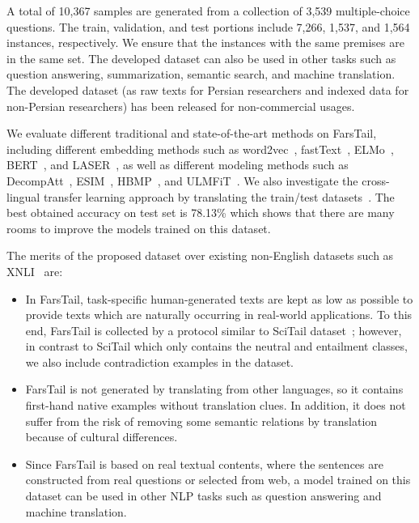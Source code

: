 \documentclass[preprint,12pt]{elsarticle}
\begin{document}
A total of 10,367 samples are generated from a collection of 3,539 multiple-choice questions. The train, validation, and test portions include 7,266, 1,537, and 1,564 instances, respectively. We ensure that the instances with the same premises are in the same set. The developed dataset can also be used in other tasks such as question answering, summarization, semantic search, and machine translation. The developed dataset (as raw texts for Persian researchers and indexed data for non-Persian researchers) has been released for non-commercial usages. 

We evaluate different traditional and state-of-the-art methods on FarsTail, including different embedding methods such as word2vec~\citep{mikolov2013distributed}, fastText~\citep{bojanowski2017enriching}, ELMo~\citep{peters2018deep}, BERT~\citep{devlin2018bert}, and LASER~\citep{artetxe2019massively}, as well as different modeling methods such as DecompAtt~\citep{parikh2016decomposable}, ESIM~\citep{chen2016enhanced}, HBMP~\citep{talman2019sentence}, and ULMFiT~\citep{howard2018universal}. We also investigate the cross-lingual transfer learning approach by translating the train/test datasets~\citep{conneau2018xnli}. The best obtained accuracy on test set is 78.13\% which shows that there are many rooms to improve the models trained on this dataset. 

The merits of the proposed dataset over existing non-English datasets such as XNLI~\citep{conneau2018xnli} are:
\begin{itemize}
    \item In FarsTail, task-specific human-generated texts are kept as low as possible to provide texts which are naturally occurring in real-world applications. To this end, FarsTail is collected by a protocol similar to SciTail dataset~\citep{khot2018scitail}; however, in contrast to SciTail which only contains the neutral and entailment classes, we also include contradiction examples in the dataset. 
    \item FarsTail is not generated by translating from other languages, so it contains first-hand native examples without translation clues. In addition, it does not suffer from the risk of removing some semantic relations by translation because of cultural differences. 
    \item Since FarsTail is based on real textual contents, where the sentences are constructed from real questions or selected from web, a model trained on this dataset can be used in other NLP tasks such as question answering and machine translation. 
\end{itemize}
\end{document}
